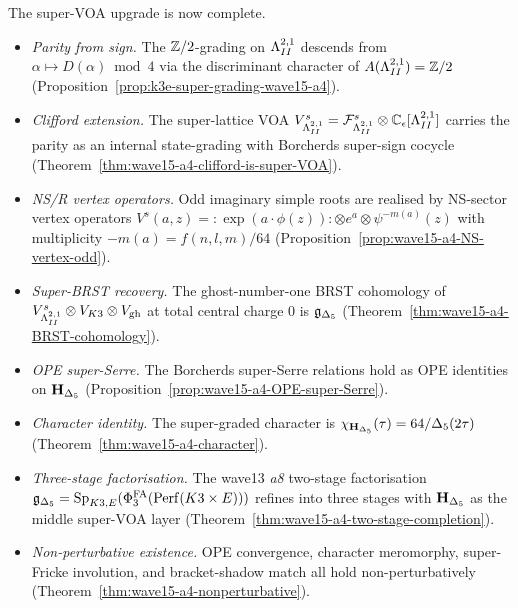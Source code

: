 The super-VOA upgrade is now complete.
\begin{itemize}
\item \emph{Parity from sign.} The $\mathbb{Z}/2$-grading on $\Lambda^{2,1}_{II}$
descends from $\alpha \mapsto D(\alpha) \bmod 4$ via the
discriminant character of $A(\Lambda^{2,1}_{II}) = \mathbb{Z}/2$
(Proposition~\ref{prop:k3e-super-grading-wave15-a4}).
\item \emph{Clifford extension.} The super-lattice VOA
$V^s_{\Lambda^{2,1}_{II}} = \mathcal{F}^s_{\Lambda^{2,1}_{II}} \otimes \mathbb{C}_\epsilon[\Lambda^{2,1}_{II}]$
carries the parity as an internal state-grading with Borcherds
super-sign cocycle
(Theorem~\ref{thm:wave15-a4-clifford-is-super-VOA}).
\item \emph{NS/R vertex operators.} Odd imaginary simple roots
are realised by NS-sector vertex operators
$V^s(a, z) = {:}\exp(a \cdot \phi(z)){:}\otimes e^a \otimes
\psi^{-m(a)}(z)$ with multiplicity $-m(a) = f(n, l, m)/64$
(Proposition~\ref{prop:wave15-a4-NS-vertex-odd}).
\item \emph{Super-BRST recovery.} The ghost-number-one BRST
cohomology of $V^s_{\Lambda^{2,1}_{II}} \otimes V_{K3} \otimes V_{\mathrm{gh}}$
at total central charge $0$ is $\mathfrak{g}_{\Delta_5}$
(Theorem~\ref{thm:wave15-a4-BRST-cohomology}).
\item \emph{OPE super-Serre.} The Borcherds super-Serre relations
hold as OPE identities on $\mathbf{H}_{\Delta_5}$
(Proposition~\ref{prop:wave15-a4-OPE-super-Serre}).
\item \emph{Character identity.} The super-graded character is
$\chi_{\mathbf{H}_{\Delta_5}}(\tau) = 64/\Delta_5(2\tau)$
(Theorem~\ref{thm:wave15-a4-character}).
\item \emph{Three-stage factorisation.} The wave13 \emph{a8} two-stage
factorisation $\mathfrak{g}_{\Delta_5} = \mathrm{Sp}_{K3,E}(\Phi^{\mathrm{FA}}_3(\mathrm{Perf}(K3 \times E)))$
refines into three stages with $\mathbf{H}_{\Delta_5}$ as the middle super-VOA
layer (Theorem~\ref{thm:wave15-a4-two-stage-completion}).
\item \emph{Non-perturbative existence.} OPE convergence, character
meromorphy, super-Fricke involution, and bracket-shadow match all
hold non-perturbatively (Theorem~\ref{thm:wave15-a4-nonperturbative}).
\end{itemize}

